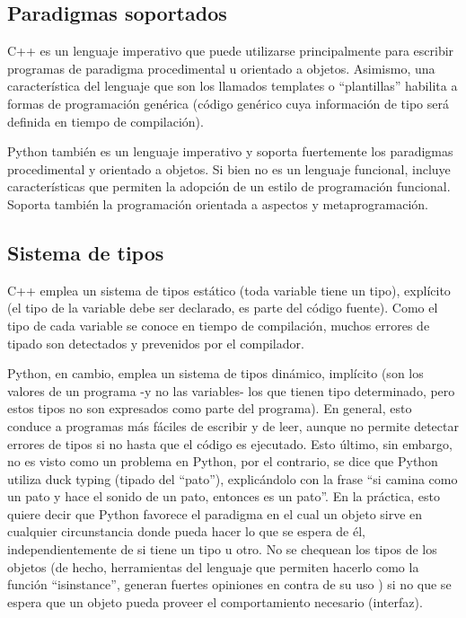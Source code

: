 \subsection{Paradigmas soportados}

C++ es un lenguaje imperativo que puede utilizarse principalmente para escribir
programas de paradigma procedimental u orientado a objetos. Asimismo, una
característica del lenguaje que son los llamados templates o ``plantillas''
habilita a formas de programación genérica (código genérico cuya información de
tipo será definida en tiempo de compilación).

Python también es un lenguaje imperativo y soporta fuertemente los paradigmas
procedimental y orientado a objetos. Si bien no es un lenguaje funcional,
incluye características que permiten la adopción de un estilo de programación
funcional. Soporta también la programación orientada a aspectos y
metaprogramación.

\subsection{Sistema de tipos}

C++ emplea un sistema de tipos estático (toda variable tiene un tipo),
explícito (el tipo de la variable debe ser declarado, es parte del código
fuente). Como el tipo de cada variable se conoce en tiempo de compilación,
muchos errores de tipado son detectados y prevenidos por el compilador.

Python, en cambio, emplea un sistema de tipos dinámico, implícito (son los
valores de un programa -y no las variables- los que tienen tipo determinado,
pero estos tipos no son expresados como parte del programa). En general, esto
conduce a programas más fáciles de escribir y de leer, aunque no permite
detectar errores de tipos si no hasta que el código es ejecutado. Esto último,
sin embargo, no es visto como un problema en Python, por el contrario, se dice
que Python utiliza duck typing \cite{duck} (tipado del ``pato''), explicándolo
con la frase ``si camina como un pato y hace el sonido de un pato, entonces es
un pato''. En la práctica, esto quiere decir que Python favorece el paradigma
en el cual un objeto sirve en cualquier circunstancia donde pueda hacer lo que
se espera de él, independientemente de si tiene un tipo u otro. No se chequean
los tipos de los objetos (de hecho, herramientas del lenguaje que permiten
hacerlo como la función ``isinstance'', generan fuertes opiniones en contra de
su uso \cite{isinstance}) si no que se espera que un objeto pueda proveer el
comportamiento necesario (interfaz).

